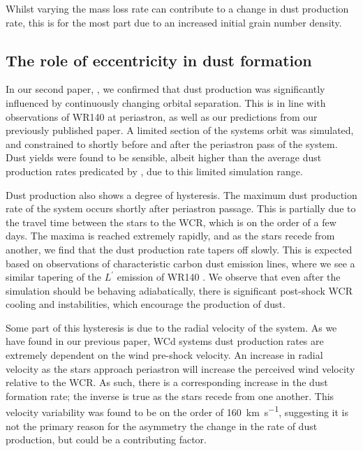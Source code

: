Whilst varying the mass loss rate can contribute to a change in dust production rate, this is for the most part due to an increased initial grain number density.

\subsection{The role of eccentricity in dust formation}

In our second paper, \emph{\secondpapertitle}, we confirmed that dust production was significantly influenced by continuously changing orbital separation.
This is in line with observations of WR140 at periastron, as well as our predictions from our previously published paper.
A limited section of the systems orbit was simulated, and constrained to shortly before and after the periastron pass of the system.
Dust yields were found to be sensible, albeit higher than the average dust production rates predicated by \textcite{lauRevisitingImpactDust2020}, due to this limited simulation range.

Dust production also shows a degree of hysteresis.
The maximum dust production rate of the system occurs shortly after periastron passage.
This is partially due to the travel time between the stars to the WCR, which is on the order of a few days.
The maxima is reached extremely rapidly, and as the stars recede from another, we find that the dust production rate tapers off slowly.
This is expected based on observations of characteristic carbon dust emission lines, where we see a similar tapering of the $L^\prime$ emission of WR140 \parencite{crowther_dust_2003}.
We observe that even after the simulation should be behaving adiabatically, there is significant post-shock WCR cooling and instabilities, which encourage the production of dust.

Some part of this hysteresis is due to the radial velocity of the system.
As we have found in our previous paper, WCd systems dust production rates are extremely dependent on the wind pre-shock velocity.
An increase in radial velocity as the stars approach periastron will increase the perceived wind velocity relative to the WCR.
As such, there is a corresponding increase in the dust formation rate; the inverse is true as the stars recede from one another.
This velocity variability was found to be on the order of \SI{160}{km.s^{-1}}, suggesting it is not the primary reason for the asymmetry the change in the rate of dust production, but could be a contributing factor.

